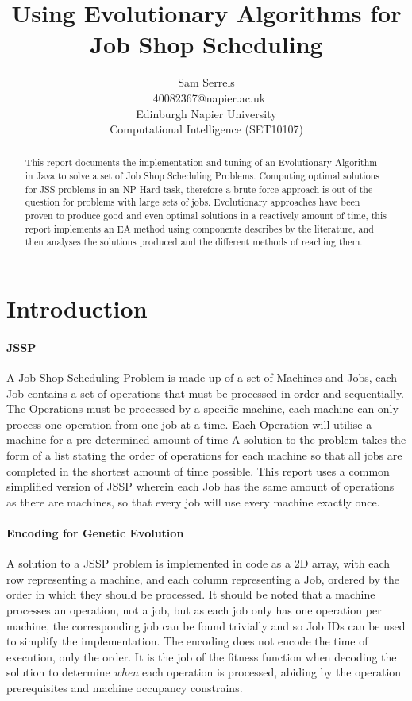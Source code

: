 \documentclass[14pt]{acmsiggraph}
\title{Using Evolutionary Algorithms for Job Shop Scheduling}
\author{Sam Serrels\\\ 40082367@napier.ac.uk \\
Edinburgh Napier University\\
Computational Intelligence (SET10107)}
\begin{document}
\maketitle
\begin{abstract}
	This report documents the implementation and tuning of an Evolutionary Algorithm in Java to solve a set of Job Shop Scheduling Problems. Computing optimal solutions for JSS problems in an NP-Hard task, therefore a brute-force approach is out of the question for problems with large sets of jobs. Evolutionary approaches have been proven to produce good and even optimal solutions in a reactively amount of time, this report implements an EA method using components describes by the literature, and then analyses the solutions produced and the different methods of reaching them.
\end{abstract}

\section{Introduction}
\paragraph{JSSP}
A Job Shop Scheduling Problem is made up of a set of Machines and Jobs, each Job contains a set of operations that must be processed in order and sequentially. The  Operations must be processed by a specific machine, each machine can only process one operation from one job at a time. Each Operation will utilise a machine for a pre-determined amount of time  A solution to the problem takes the form of a list stating the order of operations for each machine so that all jobs are completed in the shortest amount of time possible. This report uses a common simplified version of JSSP wherein each Job has the same amount of operations as there are machines, so that every job will use every machine exactly once.

\paragraph{Encoding for Genetic Evolution}
A solution to a JSSP problem is implemented in code as a 2D array, with each row representing a machine, and each column representing a Job, ordered by the order in which they should be processed. It should be noted that a machine processes an operation, not a job, but as each job only has one operation per machine, the corresponding job can be found trivially and so Job IDs can be used to simplify the implementation. The encoding does not encode the time of execution, only the order.  It is the job of the fitness function when decoding the solution to determine \textit{when} each operation is processed, abiding by the operation prerequisites and machine occupancy constrains. 
\end{document}
